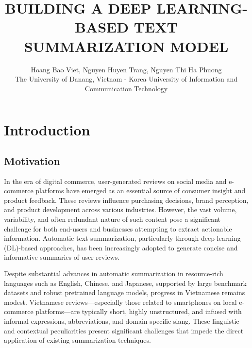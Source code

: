 \documentclass{article}
\title{\textbf{\LARGE BUILDING A DEEP LEARNING-BASED TEXT SUMMARIZATION MODEL}}
\author{
Hoang Bao Viet, 
Nguyen Huyen Trang, 
Nguyen Thi Ha Phuong \\
The University of Danang, Vietnam - Korea University of Information and Communication Technology
}
\date{}
\begin{document}
\sloppy


\section{Introduction}

\subsection{Motivation}
In the era of digital commerce, user-generated reviews on social media and e-commerce platforms have emerged as an essential source of consumer insight and product feedback. These reviews influence purchasing decisions, brand perception, and product development across various industries. However, the vast volume, variability, and often redundant nature of such content pose a significant challenge for both end-users and businesses attempting to extract actionable information. Automatic text summarization, particularly through deep learning (DL)-based approaches, has been increasingly adopted to generate concise and informative summaries of user reviews.

Despite substantial advances in automatic summarization in resource-rich languages such as English, Chinese, and Japanese, supported by large benchmark datasets and robust pretrained language models, progress in Vietnamese remains modest. Vietnamese reviews—especially those related to smartphones on local e-commerce platforms—are typically short, highly unstructured, and infused with informal expressions, abbreviations, and domain-specific slang. These linguistic and contextual peculiarities present significant challenges that impede the direct application of existing summarization techniques.
\end{document}
